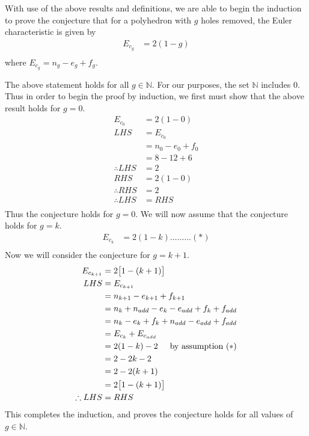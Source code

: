 \documentclass[a4paper]{article}
\begin{document}
\begin{enumerate}[label=\textbf{\arabic*.}]
\begin{enumerate}
		\pagebreak

		With use of the above results and definitions, we are able to begin the induction to prove the conjecture that for a polyhedron with $\displaystyle{g}$ holes removed, the Euler characteristic is given by 
		\begin{align*}
		E_{c_g} & = 2(1-g)\\
		\end{align*}
		where $\displaystyle{E_{c_g} = n_g - e_g + f_g}$.

		\bigbreak

		The above statement holds for all $\displaystyle{g \in \mathbb{N}}$. For our purposes, the set $\displaystyle{\mathbb{N}}$ includes 0. Thus in order to begin the proof by induction, we first must show that the above result holds for $\displaystyle{g=0}$. 
		\begin{align*}
		E_{c_0} & = 2(1-0)\\
		LHS & = E_{c_0}\\
		& = n_0 - e_0 + f_0\\
		& = 8 - 12 + 6\\
		\therefore LHS & = 2\\
		RHS & = 2(1-0)\\
		\therefore RHS & = 2\\
		\therefore LHS & = RHS\\
		\end{align*}
		Thus the conjecture holds for $\displaystyle{g=0}$. We will now assume that the conjecture holds for $\displaystyle{g=k}$. 
		\begin{align*}
		E_{c_{k}} & = 2(1-k) \dots \dots \dots (*)\\
		\end{align*}
		Now we will consider the conjecture for $\displaystyle{g=k+1}$. 
		\begin{align*}
		E_{c_{k+1}} & = 2\big[1-(k+1)\big]\\
		LHS & = E_{c_{k+1}}\\
		& = n_{k+1} - e_{k+1} + f_{k+1}\\
		& = n_{k} + n_{add} - e_{k} - e_{add} + f_{k} + f_{add}\\
		& = n_{k} - e_{k} + f_{k} + n_{add} - e_{add} + f_{add}\\
		& = E_{c_{k}} + E_{c_{add}}\\
		& = 2(1-k) - 2 \hspace{5mm} \text{by assumption $(*)$}\\
		& = 2 - 2k - 2\\
		& = 2 - 2(k+1)\\
		& = 2\big[1-(k+1)\big]\\
		\therefore LHS & = RHS\\
		\end{align*}
		This completes the induction, and proves the conjecture holds for all values of $\displaystyle{g \in \mathbb{N}}$.

	\end{enumerate}


\end{enumerate}
\end{document}
